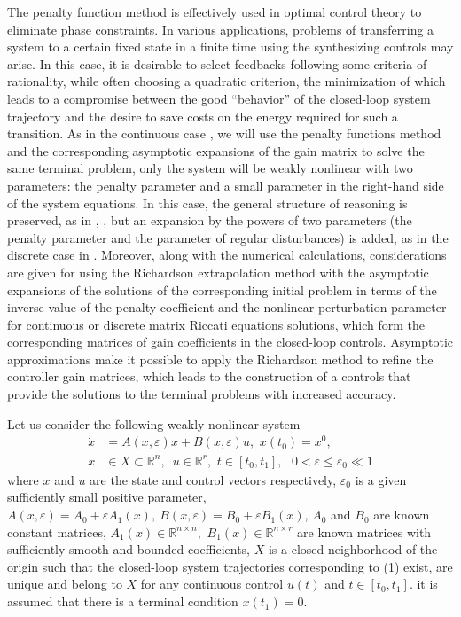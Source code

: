 \documentclass[12pt]{llncs}
\begin{document}
The penalty function method is effectively used in optimal control theory to eliminate phase constraints. In various applications, problems of transferring a system to a certain fixed state in a finite time using the synthesizing controls may arise.
In this case, it is desirable to select feedbacks following some criteria of rationality, while often choosing a quadratic criterion, the minimization of which leads to a compromise between the good “behavior” of the closed-loop system trajectory
and the desire to save costs on the energy required for such a transition. As in the continuous case \cite{GlizDmitr1977}, we will use the penalty functions method and the corresponding asymptotic expansions of the gain matrix to solve the same terminal problem,
only the system will be weakly nonlinear with two parameters: the penalty parameter and a small parameter in the right-hand side of the system equations. In this case, the general structure of reasoning is preserved, as in  \cite{GlizDmitr1977},  \cite{GlizDmitr1981}, \cite{DmitMak2018} but an expansion by the powers of two parameters (the penalty parameter and the parameter of regular disturbances) is added, as in the discrete case in \cite{Motor2023}. Moreover, along with the numerical calculations, considerations are given for using the Richardson extrapolation method with the asymptotic expansions of the solutions of the corresponding initial problem in terms of the inverse value of the penalty coefficient and the nonlinear perturbation parameter for continuous or discrete matrix Riccati equations solutions, which form the corresponding matrices of gain coefficients in the closed-loop controls. Asymptotic
approximations make it possible to apply the Richardson method \cite{Marchuk1979} to refine the controller gain matrices, which leads to the construction of a controls that provide the solutions to the terminal problems with increased accuracy.

Let us consider the following weakly nonlinear system
\begin{equation}
  \begin{aligned}
    \dot x & = A(x,\varepsilon )x + B(x,\varepsilon )u,\,\,x({t_0}) = {x^0}, \\
    x & \in X \subset {\mathbb{R}^n},\,\,\,u \in {\mathbb{R}^r},\,\,t \in \left[ {{t_0},{t_1}} \right],\,\,\,\,0 < \varepsilon \leq{\varepsilon _0} \ll 1
  \end{aligned}
\end{equation}
where $x$ and $u$ are the state and control vectors respectively, $\varepsilon_0$ is a given sufficiently small positive parameter, $A(x,\varepsilon) = {A_0} + \varepsilon {A_1}(x),~ B(x,\varepsilon) = {B_0} + \varepsilon {B_1}(x)$, $A_0$ and $B_0$ are known constant matrices, ${A_1}(x) \in {\mathbb{R}^{n \times n}},\,\,{B_1}(x) \in {\mathbb{R}^{n \times r}}$  are known matrices with sufficiently smooth and bounded coefficients, $X$ is a closed neighborhood of the origin such that the closed-loop system trajectories corresponding to (1) exist, are unique and belong to $X$ for any continuous control $u(t)$ and $t \in \left[ {{t_0},{t_1}} \right]$. it is assumed that there is a terminal condition $x({t_1}) = {0}$.
\end{document}
